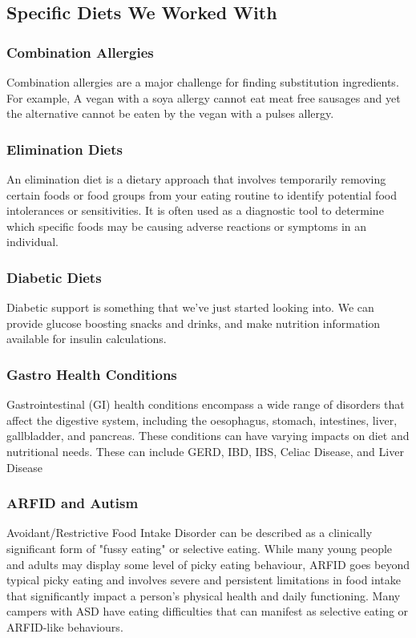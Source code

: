 \subsection{Specific Diets We Worked With}
\subsubsection{Combination Allergies}
Combination allergies are a major challenge for finding substitution ingredients. For example, A vegan with a soya allergy cannot eat meat free sausages and yet the alternative cannot be eaten by the vegan with a pulses allergy. 
\subsubsection{Elimination Diets}
An elimination diet is a dietary approach that involves temporarily removing certain foods or food groups from your eating routine to identify potential food intolerances or sensitivities. It is often used as a diagnostic tool to determine which specific foods may be causing adverse reactions or symptoms in an individual. 
\subsubsection{Diabetic Diets}
Diabetic support is something that we've just started looking into. We can provide glucose boosting snacks and drinks, and make nutrition information available for insulin calculations.
\subsubsection{Gastro Health Conditions}
Gastrointestinal (GI) health conditions encompass a wide range of disorders that affect the digestive system, including the oesophagus, stomach, intestines, liver, gallbladder, and pancreas. These conditions can have varying impacts on diet and nutritional needs. These can include GERD, IBD, IBS, Celiac Disease, and Liver Disease 
\subsubsection{ARFID and Autism}
Avoidant/Restrictive Food Intake Disorder can be described as a clinically significant form of "fussy eating" or selective eating. While many young people and adults may display some level of picky eating behaviour, ARFID goes beyond typical picky eating and involves severe and persistent limitations in food intake that significantly impact a person's physical health and daily functioning. Many campers with ASD have eating difficulties that can manifest as selective eating or ARFID-like behaviours. 
